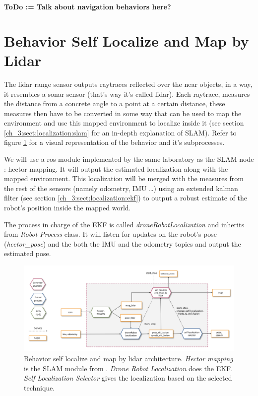   \textbf{ToDo := Talk about navigation behaviors here?}

\section{Behavior Self Localize and Map by Lidar} \label{ch_4:sect:behav_slam}

  The lidar range sensor outputs raytraces reflected over the near objects, in a way, it resembles a sonar sensor (that's way it's called lidar). Each raytrace, measures the distance from a concrete angle to a point at a certain distance, these measures then have to be converted in some way that can be used to map the environment and use this mapped environment to localize inside it (see section \ref{ch_3:sect:localization:slam} for an in-depth explanation of SLAM). Refer to figure \ref{ch_4:fig:behav_slam} for a visual representation of the behavior and it's subprocesses.

  We will use a ros module implemented by the same laboratory as the SLAM node \cite{hector_slam}: hector mapping. It will output the estimated localization along with the mapped environment. This localization will be merged with the measures from the rest of the sensors (namely odometry, IMU \dots) using an extended kalman filter (see section \ref{ch_3:sect:localization:ekf}) to output a robust estimate of the robot's position inside the mapped world. 

  The process in charge of the EKF is called \textit{droneRobotLocalization} and inherits from \textit{Robot Process} class. It will listen for updates on the robot's pose (\textit{hector\_pose}) and the both the IMU and the odometry topics and output the estimated pose.

  \begin{figure}[h] 
    \centering
    \includegraphics[width=\textwidth]{./Figures/BehaviorSlamArquitecture.png}
    \caption{Behavior self localize and map by lidar architecture. \textit{Hector mapping} is the SLAM module from \cite{hector_slam}. \textit{Drone Robot Localization} does the EKF. \textit{Self Localization Selector} gives the localization based on the selected technique.}
    \label{ch_4:fig:behav_slam}
  \end{figure}

